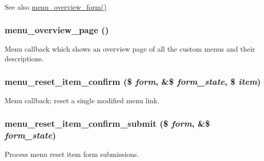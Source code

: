 \begin{DoxySeeAlso}{See also}
\hyperlink{menu_8admin_8inc_a460cda2f4e09b8281c8c9e01bf65360b}{menu\_\-overview\_\-form()} 
\end{DoxySeeAlso}
\hypertarget{menu_8admin_8inc_a2815b30b87a9fb3bbda9cf044a81e25b}{
\subsubsection[{menu\_\-overview\_\-page}]{\setlength{\rightskip}{0pt plus 5cm}menu\_\-overview\_\-page ()}}
\label{menu_8admin_8inc_a2815b30b87a9fb3bbda9cf044a81e25b}
Menu callback which shows an overview page of all the custom menus and their descriptions. \hypertarget{menu_8admin_8inc_a81f4a32073dbf3043c53b003ba0ba499}{
\subsubsection[{menu\_\-reset\_\-item\_\-confirm}]{\setlength{\rightskip}{0pt plus 5cm}menu\_\-reset\_\-item\_\-confirm (\$ {\em form}, \/  \&\$ {\em form\_\-state}, \/  \$ {\em item})}}
\label{menu_8admin_8inc_a81f4a32073dbf3043c53b003ba0ba499}
Menu callback; reset a single modified menu link. \hypertarget{menu_8admin_8inc_a84c625e0f863a78cf6c68f16e136422f}{
\subsubsection[{menu\_\-reset\_\-item\_\-confirm\_\-submit}]{\setlength{\rightskip}{0pt plus 5cm}menu\_\-reset\_\-item\_\-confirm\_\-submit (\$ {\em form}, \/  \&\$ {\em form\_\-state})}}
\label{menu_8admin_8inc_a84c625e0f863a78cf6c68f16e136422f}
Process menu reset item form submissions. 